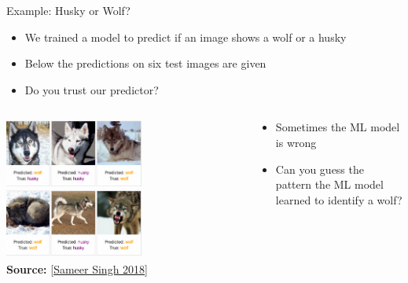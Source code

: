 \documentclass[11pt,compress,t,notes=noshow, aspectratio=169, xcolor=table]{beamer}
\begin{document}
\begin{vbframe}[c]{Example: Husky or Wolf?}
	\begin{itemize}
		\item We trained a model to predict if an image shows a wolf or a husky 
		\item Below the predictions on six test images are given 
		\item Do you trust our predictor? 
	\end{itemize}
	
	\begin{columns}
	
	\begin{column}{0.6\textwidth}
	    
    	\begin{center}
    		\includegraphics[width=0.58\textwidth]{figure/lime-wolfhusky.png}\\
    		\includegraphics[width=0.58\textwidth]{figure/lime-wolfhusky2.png}\\
    		{\textbf{Source:} [\href{http://www.facweb.iitkgp.ac.in/~niloy/COURSE/Spring2018/IntelligentSystem/PPT_2018/why_should_i_trust_ppt.pdf}{Sameer Singh 2018}]}
    	\end{center}
	    
	\end{column}
	
	\begin{column}{0.4\textwidth}
	    
	\begin{itemize}
		\item Sometimes the ML model is wrong
		\item Can you guess the pattern the ML model learned to identify a wolf?
	\end{itemize}
	    
	\end{column}
	    
	\end{columns}

\end{vbframe}
\end{document}
